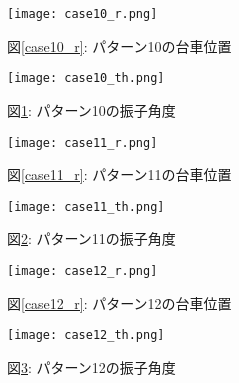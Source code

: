 \begin{figure}[htbp]
    \begin{minipage}{0.5\hsize}
        \begin{center}
            \texttt{[image: case10\_r.png]}
            \caption{図\ref{case10_r}: パターン10の台車位置}
            \label{case10_r}
        \end{center}
    \end{minipage}
    \begin{minipage}{0.5\hsize}
        \begin{center}
            \texttt{[image: case10\_th.png]}
            \caption{図\ref{case10_th}: パターン10の振子角度}
            \label{case10_th}
        \end{center}
    \end{minipage}
\end{figure}

\begin{figure}[htbp]
    \begin{minipage}{0.5\hsize}
        \begin{center}
            \texttt{[image: case11\_r.png]}
            \caption{図\ref{case11_r}: パターン11の台車位置}
            \label{case11_r}
        \end{center}
    \end{minipage}
    \begin{minipage}{0.5\hsize}
        \begin{center}
            \texttt{[image: case11\_th.png]}
            \caption{図\ref{case11_th}: パターン11の振子角度}
            \label{case11_th}
        \end{center}
    \end{minipage}
\end{figure}

\begin{figure}[htbp]
    \begin{minipage}{0.5\hsize}
        \begin{center}
            \texttt{[image: case12\_r.png]}
            \caption{図\ref{case12_r}: パターン12の台車位置}
            \label{case12_r}
        \end{center}
    \end{minipage}
    \begin{minipage}{0.5\hsize}
        \begin{center}
            \texttt{[image: case12\_th.png]}
            \caption{図\ref{case12_th}: パターン12の振子角度}
            \label{case12_th}
        \end{center}
    \end{minipage}
\end{figure}

